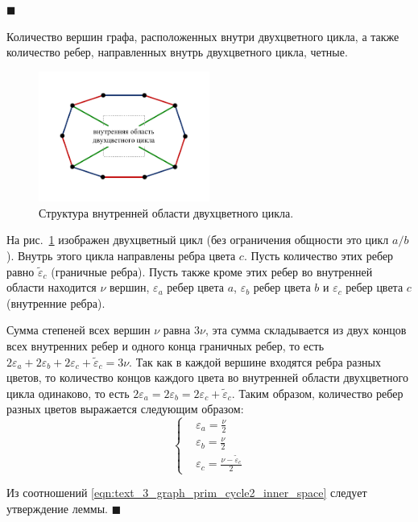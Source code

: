 $\blacksquare$\\


\begin{lemma}\label{lem:text_3_graph_prim_cycle2_inner_space}
Количество вершин графа, расположенных внутри двухцветного цикла, а также количество ребер, направленных внутрь двухцветного цикла, четные.
\end{lemma}

\begin{figure}[ht]
	\centering
		\includegraphics[width=0.5\textwidth]{./pics/text_3_graph_prim/cycle2_inner_space.pdf}
	\caption{Структура внутренней области двухцветного цикла.}
	\label{fig:text_3_graph_prim_cycle2_inner_space}
\end{figure}

На рис.~\ref{fig:text_3_graph_prim_cycle2_inner_space} изображен двухцветный цикл (без ограничения общности это цикл $a/b$).
Внутрь этого цикла направлены ребра цвета $c$.
Пусть количество этих ребер равно $\tilde{\varepsilon}_c$ (граничные ребра).
Пусть также кроме этих ребер во внутренней области находится $\nu$ вершин, $\varepsilon_a$ ребер цвета $a$, $\varepsilon_b$ ребер цвета $b$ и $\varepsilon_c$ ребер цвета $c$ (внутренние ребра).

Сумма степеней всех вершин $\nu$ равна $3\nu$, эта сумма складывается из двух концов всех внутренних ребер и одного конца граничных ребер, то есть $2\varepsilon_a + 2\varepsilon_b + 2\varepsilon_c + \tilde{\varepsilon}_c = 3\nu$.
Так как в каждой вершине входятся ребра разных цветов, то количество концов каждого цвета во внутренней области двухцветного цикла одинаково, то есть $2\varepsilon_a = 2\varepsilon_b = 2\varepsilon_c + \tilde{\varepsilon}_c$.
Таким образом, количество ребер разных цветов выражается следующим образом:
\begin{equation}\label{eqn:text_3_graph_prim_cycle2_inner_space}
	\left\{
		\begin{aligned}
			& \varepsilon_a = \frac{\nu}{2} \\
			& \varepsilon_b = \frac{\nu}{2} \\
			& \varepsilon_c = \frac{\nu - \tilde{\varepsilon}_c}{2}
		\end{aligned}
	\right.
\end{equation}

Из соотношений \eqref{eqn:text_3_graph_prim_cycle2_inner_space} следует утверждение леммы. $\blacksquare$\\

